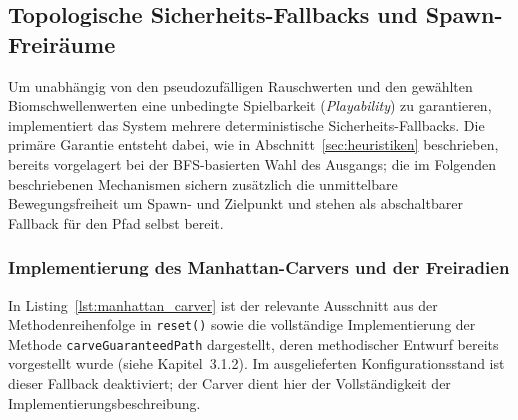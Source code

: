 \documentclass[
  a4paper,
  11pt,
  twoside,
  BCOR=8mm,           %
  headings=big,
  numbers=noenddot,
  listof=totoc,       %
  captions=tableheading,
]{scrreprt}
\begin{document}
\subsection{Topologische Sicherheits-Fallbacks und Spawn-Freiräume}
\label{sec:umsetzung_pathing}

Um unabhängig von den pseudozufälligen Rauschwerten und den gewählten Biomschwellenwerten eine unbedingte Spielbarkeit (\textit{Playability}) zu garantieren, implementiert das System mehrere deterministische Sicherheits-Fallbacks. Die primäre Garantie entsteht dabei, wie in Abschnitt~\ref{sec:heuristiken} beschrieben, bereits vorgelagert bei der BFS-basierten Wahl des Ausgangs; die im Folgenden beschriebenen Mechanismen sichern zusätzlich die unmittelbare Bewegungsfreiheit um Spawn- und Zielpunkt und stehen als abschaltbarer Fallback für den Pfad selbst bereit.

\subsubsection{Implementierung des Manhattan-Carvers und der Freiradien}
In Listing~\ref{lst:manhattan_carver} ist der relevante Ausschnitt aus der Methodenreihenfolge in \texttt{reset()} sowie die vollständige Implementierung der Methode \texttt{carveGuaranteedPath} dargestellt, deren methodischer Entwurf bereits vorgestellt wurde (siehe Kapitel~3.1.2). Im ausgelieferten Konfigurationsstand ist dieser Fallback deaktiviert; der Carver dient hier der Vollständigkeit der Implementierungsbeschreibung.
\end{document}
